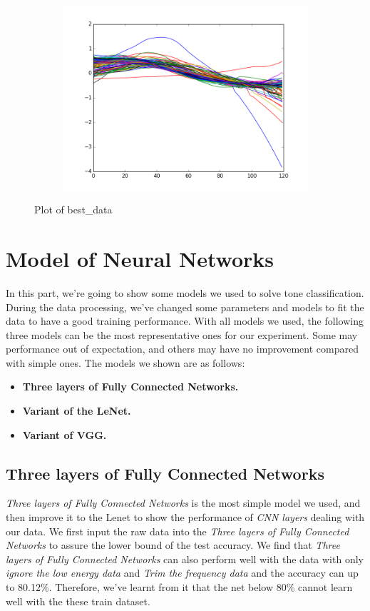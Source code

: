 \documentclass[12pt]{article}
\begin{document}
\begin{figure}[htb]
\begin{subfigure}[b]{0.49\textwidth}
	\end{subfigure}
	~
	\begin{subfigure}[b]{0.49\textwidth}
    	\includegraphics[width=\textwidth]{best-3}
	\end{subfigure}
	\caption{Plot of best\_data}
\end{figure}

\section{Model of Neural Networks}
In this part, we're going to show some models we used to solve tone classification. During the data processing, we've changed some parameters and models to fit the data to have a good training performance. With all models we used, the following three models can be the most representative ones for our experiment. Some may performance out of expectation, and others may have no improvement compared with simple ones. The models we shown are as follows:
\begin{itemize}
	\item {\bf Three layers of Fully Connected Networks.}
	\item {\bf Variant of the LeNet.}
	\item {\bf Variant of VGG.}
\end{itemize}

\subsection{Three layers of Fully Connected Networks}
{\it Three layers of Fully Connected Networks} is the most simple model we used, and then improve it to the Lenet to show the performance of {\it CNN layers} dealing with our data.
We first input the raw data into the {\it Three layers of Fully Connected Networks} to assure the lower bound of the test accuracy. We find that {\it Three layers of Fully Connected Networks} can also perform well with the data with only {\it ignore the low energy data} and {\it Trim the frequency data} and the accuracy can up to 80.12\%. Therefore, we've learnt from it that the net below 80\% cannot learn well with the these train dataset.
\end{document}
